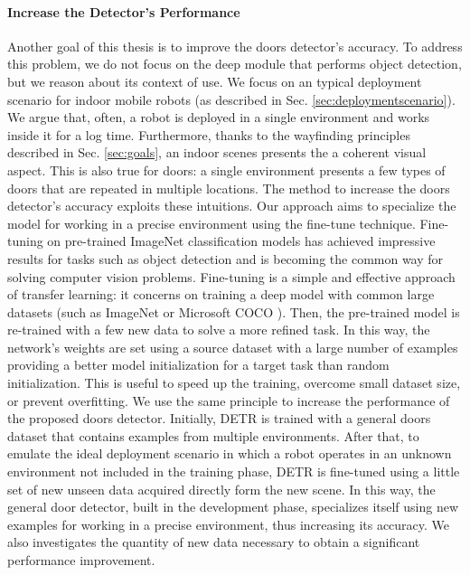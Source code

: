 \paragraph{Increase the Detector's Performance} Another goal of this thesis is to improve the doors detector's accuracy. To address this problem, we do not focus on the deep module that performs object detection, but we reason about its context of use. We focus on an typical deployment scenario for indoor mobile robots (as described in Sec. \ref{sec:deploymentscenario}). We argue that, often, a robot is deployed in a single environment and works inside it for a log time. Furthermore, thanks to  the wayfinding principles described in Sec. \ref{sec:goals}, an indoor scenes presents the a coherent visual aspect. This is also true for doors: a single environment presents a few types of doors that are repeated in multiple locations. The method to increase the doors detector's accuracy exploits these intuitions. Our approach aims to specialize the model for working in a precise environment using the fine-tune technique. Fine-tuning on pre-trained ImageNet classification models \cite{verydeepimagenet, resnet} has achieved impressive results for tasks such as object detection \cite{fasterrcnn, yolo, yolov2} and is becoming the common way for solving computer vision problems. Fine-tuning is a simple and effective
approach of transfer learning: it concerns on training a deep model with common large datasets (such as ImageNet \cite{imagenet} or Microsoft COCO \cite{coco}). Then, the pre-trained model is re-trained with a few new data to solve a more refined task. In this way, the network's weights are set using a source dataset with a large number of examples providing a better
model initialization for a target task than random initialization. This is useful to speed up the training, overcome small dataset size, or prevent overfitting. We use the same principle to increase the performance of the proposed doors detector. Initially, DETR is trained with a general doors dataset that contains examples from multiple environments. After that, to emulate the ideal deployment scenario in which a robot operates in an unknown environment not included in the training phase, DETR is fine-tuned using a little set of new unseen data acquired directly form the new scene. In this way, the general door detector, built in the development phase, specializes itself using new examples for working in a precise environment, thus increasing its accuracy. We also investigates the quantity of new data necessary to obtain a significant performance improvement.

